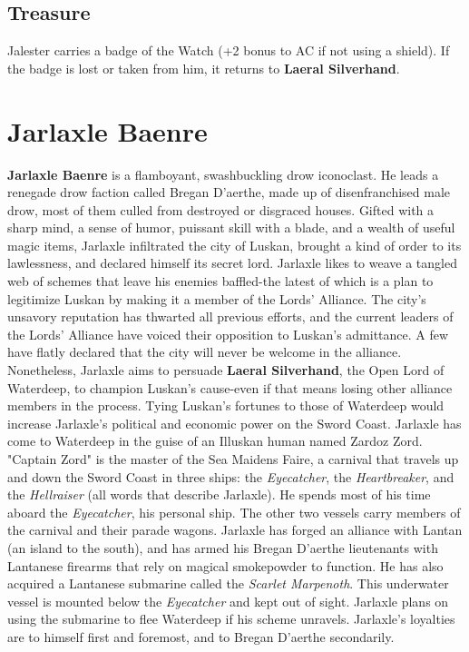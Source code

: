 \documentclass[10pt,a4paper,twoside,twocolumn,openany,nodeprecatedcode]{dndbook}
\begin{document}
\subsection{Treasure}
Jalester carries a badge of the Watch (+2 bonus to AC if not using a shield). If the badge is lost or taken from him, it returns to \textbf{Laeral Silverhand}.
\section{Jarlaxle Baenre}
\textbf{Jarlaxle Baenre} is a flamboyant, swashbuckling drow iconoclast. He leads a renegade drow faction called Bregan D'aerthe, made up of disenfranchised male drow, most of them culled from destroyed or disgraced houses. Gifted with a sharp mind, a sense of humor, puissant skill with a blade, and a wealth of useful magic items, Jarlaxle infiltrated the city of Luskan, brought a kind of order to its lawlessness, and declared himself its secret lord.
Jarlaxle likes to weave a tangled web of schemes that leave his enemies baffled-the latest of which is a plan to legitimize Luskan by making it a member of the Lords' Alliance. The city's unsavory reputation has thwarted all previous efforts, and the current leaders of the Lords' Alliance have voiced their opposition to Luskan's admittance. A few have flatly declared that the city will never be welcome in the alliance. Nonetheless, Jarlaxle aims to persuade \textbf{Laeral Silverhand}, the Open Lord of Waterdeep, to champion Luskan's cause-even if that means losing other alliance members in the process. Tying Luskan's fortunes to those of Waterdeep would increase Jarlaxle's political and economic power on the Sword Coast.
Jarlaxle has come to Waterdeep in the guise of an Illuskan human named Zardoz Zord. "Captain Zord" is the master of the Sea Maidens Faire, a carnival that travels up and down the Sword Coast in three ships: the \textit{Eyecatcher}, the \textit{Heartbreaker}, and the \textit{Hellraiser} (all words that describe Jarlaxle). He spends most of his time aboard the \textit{Eyecatcher}, his personal ship. The other two vessels carry members of the carnival and their parade wagons.
Jarlaxle has forged an alliance with Lantan (an island to the south), and has armed his Bregan D'aerthe lieutenants with Lantanese firearms that rely on magical smokepowder to function. He has also acquired a Lantanese submarine called the \textit{Scarlet Marpenoth}. This underwater vessel is mounted below the \textit{Eyecatcher} and kept out of sight. Jarlaxle plans on using the submarine to flee Waterdeep if his scheme unravels.
Jarlaxle's loyalties are to himself first and foremost, and to Bregan D'aerthe secondarily.
\end{document}
